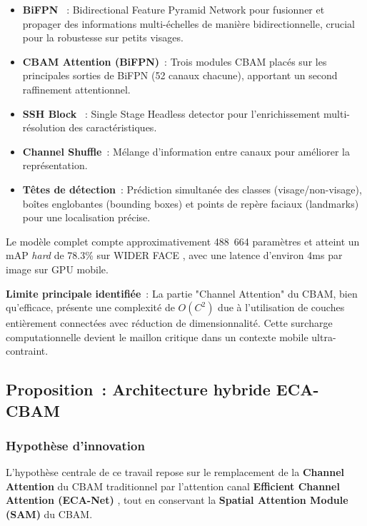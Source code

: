 \begin{onehalfspace}
\begin{itemize}
\item \textbf{BiFPN} \cite{Tan2020EfficientDet}~: Bidirectional Feature Pyramid Network pour fusionner et propager des informations multi-échelles de manière bidirectionnelle, crucial pour la robustesse sur petits visages.

\item \textbf{CBAM Attention (BiFPN)}~: Trois modules CBAM placés sur les principales sorties de BiFPN (52 canaux chacune), apportant un second raffinement attentionnel.

\item \textbf{SSH Block} \cite{Najibi2017SSH}~: Single Stage Headless detector pour l'enrichissement multi-résolution des caractéristiques.

\item \textbf{Channel Shuffle}~: Mélange d'information entre canaux pour améliorer la représentation.

\item \textbf{Têtes de détection}~: Prédiction simultanée des classes (visage/non-visage), boîtes englobantes (bounding boxes) et points de repère faciaux (landmarks) pour une localisation précise.
\end{itemize}

\hspace{0.65 cm}Le modèle complet compte approximativement 488~664 paramètres et atteint un mAP \textit{hard} de 78.3\% sur WIDER FACE \cite{Yang2016WIDERFACE}, avec une latence d'environ 4ms par image sur GPU mobile.

\hspace{0.65 cm}\textbf{Limite principale identifiée}~: La partie "Channel Attention" du CBAM, bien qu'efficace, présente une complexité de $O(C^2)$ due à l'utilisation de couches entièrement connectées avec réduction de dimensionnalité. Cette surcharge computationnelle devient le maillon critique dans un contexte mobile ultra-contraint.

\subsection{Proposition~: Architecture hybride ECA-CBAM}

\subsubsection{Hypothèse d'innovation}

\hspace{0.65 cm}L'hypothèse centrale de ce travail repose sur le remplacement de la \textbf{Channel Attention} du CBAM traditionnel par l'attention canal \textbf{Efficient Channel Attention (ECA-Net)} \cite{Wang2020ECANet}, tout en conservant la \textbf{Spatial Attention Module (SAM)} du CBAM.


\end{onehalfspace}
